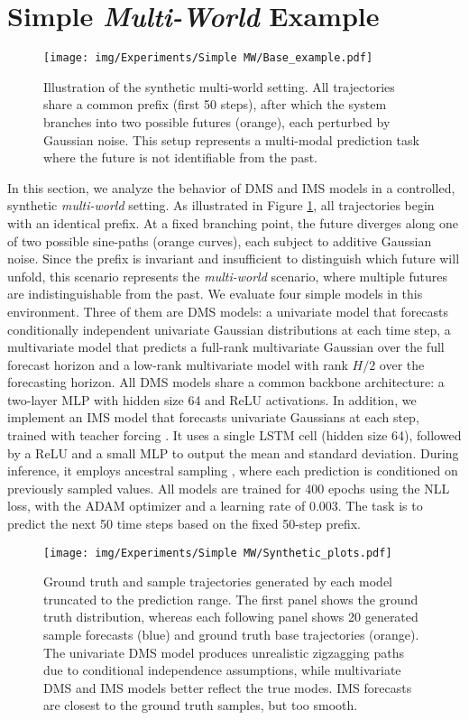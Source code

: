 \documentclass[a4paper,oneside,bibliography=totoc]{scrbook}
\begin{document}

\section{Simple \textit{Multi-World} Example}
\label{sec:example_smw}
\begin{figure}
\centering
\texttt{[image: img/Experiments/Simple MW/Base\_example.pdf]}
\caption{Illustration of the synthetic multi-world setting. All trajectories share a common prefix (first 50 steps), after which the system branches into two possible futures (orange), each perturbed by Gaussian noise. This setup represents a multi-modal prediction task where the future is not identifiable from the past.}
\label{fig:sw_example}
\end{figure}
In this section, we analyze the behavior of DMS and IMS models in a controlled, synthetic \textit{multi-world} setting. As illustrated in Figure \ref{fig:sw_example}, all trajectories begin with an identical prefix. At a fixed branching point, the future diverges along one of two possible sine-paths (orange curves), each subject to additive Gaussian noise. 
Since the prefix is invariant and insufficient to distinguish which future will unfold, this scenario represents the \textit{multi-world} scenario, where multiple futures are indistinguishable from the past.
We evaluate four simple models in this environment. Three of them are DMS models: 
a univariate model that forecasts conditionally independent univariate Gaussian distributions at each time step, a multivariate model that predicts a full-rank multivariate Gaussian over the full forecast horizon and a low-rank multivariate model with rank $H/2$ over the forecasting horizon.
All DMS models share a common backbone architecture: a two-layer MLP with hidden size 64 and ReLU activations. In addition, we implement an IMS model that forecasts univariate Gaussians at each step, trained with teacher forcing \cite{williams_learning_1989}. It uses a single LSTM cell (hidden size 64), followed by a ReLU and a small MLP to output the mean and standard deviation.
During inference, it employs ancestral sampling \cite{salinas_deepar_2020}, where each prediction is conditioned on previously sampled values.
All models are trained for 400 epochs using the NLL loss, with the ADAM optimizer and a learning rate of 0.003. The task is to predict the next 50 time steps based on the fixed 50-step prefix.
\begin{figure}
\centering
\texttt{[image: img/Experiments/Simple MW/Synthetic\_plots.pdf]}
\caption{Ground truth and sample trajectories generated by each model truncated to the prediction range.
The first panel shows the ground truth distribution, whereas each following panel shows 20 generated sample forecasts (blue) and ground truth base trajectories (orange). The univariate DMS model produces unrealistic zigzagging paths due to conditional independence assumptions, while multivariate DMS and IMS models better reflect the true modes. IMS forecasts are closest to the ground truth samples, but too smooth.}
\label{fig:sw_sample}
\end{figure}
\end{document}
